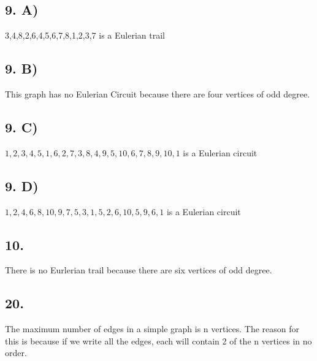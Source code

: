 \documentclass[12]{scrartcl}
\begin{document}
\subsection*{9. A)}
3,4,8,2,6,4,5,6,7,8,1,2,3,7 is a Eulerian trail
\subsection*{9. B)}
This graph has no Eulerian Circuit because there are four vertices of odd degree.
\subsection*{9. C)}
$1,2,3,4,5,1,6,2,7,3,8,4,9,5,10,6,7,8,9,10,1$ is a Eulerian circuit
\subsection*{9. D)}
$1,2,4,6,8,10,9,7,5,3,1,5,2,6,10,5,9,6,1$ is a Eulerian circuit
\subsection*{10.}
There is no Eurlerian trail because there are six vertices of odd degree.
\subsection*{20.}
The maximum number of edges in a simple graph is n vertices. The reason for this is because if we write all the edges, each will contain 2 of the n vertices in no order. 
\end{document}
